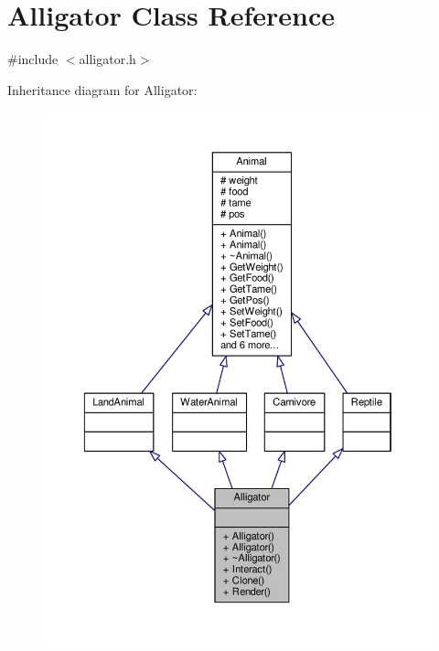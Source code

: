 \hypertarget{classAlligator}{}\section{Alligator Class Reference}
\label{classAlligator}


{\ttfamily \#include $<$alligator.\+h$>$}



Inheritance diagram for Alligator\+:
\nopagebreak
\begin{figure}[H]
\begin{center}
\leavevmode
\includegraphics[width=350pt]{classAlligator__inherit__graph}
\end{center}
\end{figure}


